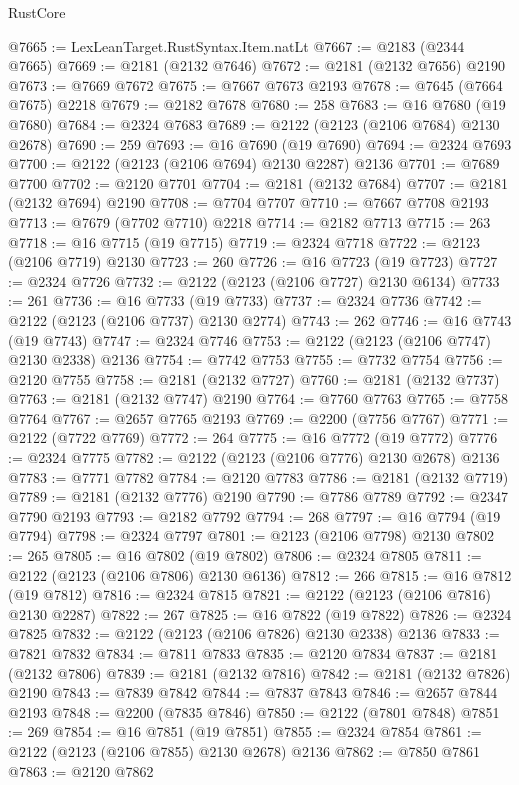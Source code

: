 \begin{lexlean}{RustCore}
\begin{coremodule}
@7665 := LexLeanTarget.RustSyntax.Item.natLt
@7667 := @2183 (@2344 @7665)
@7669 := @2181 (@2132 @7646)
@7672 := @2181 (@2132 @7656) @2190
@7673 := @7669 @7672
@7675 := @7667 @7673 @2193
@7678 := @7645 (@7664 @7675) @2218
@7679 := @2182 @7678
@7680 := 258
@7683 := @16 @7680 (@19 @7680)
@7684 := @2324 @7683
@7689 := @2122 (@2123 (@2106 @7684) @2130 @2678)
@7690 := 259
@7693 := @16 @7690 (@19 @7690)
@7694 := @2324 @7693
@7700 := @2122 (@2123 (@2106 @7694) @2130 @2287) @2136
@7701 := @7689 @7700
@7702 := @2120 @7701
@7704 := @2181 (@2132 @7684)
@7707 := @2181 (@2132 @7694) @2190
@7708 := @7704 @7707
@7710 := @7667 @7708 @2193
@7713 := @7679 (@7702 @7710) @2218
@7714 := @2182 @7713
@7715 := 263
@7718 := @16 @7715 (@19 @7715)
@7719 := @2324 @7718
@7722 := @2123 (@2106 @7719) @2130
@7723 := 260
@7726 := @16 @7723 (@19 @7723)
@7727 := @2324 @7726
@7732 := @2122 (@2123 (@2106 @7727) @2130 @6134)
@7733 := 261
@7736 := @16 @7733 (@19 @7733)
@7737 := @2324 @7736
@7742 := @2122 (@2123 (@2106 @7737) @2130 @2774)
@7743 := 262
@7746 := @16 @7743 (@19 @7743)
@7747 := @2324 @7746
@7753 := @2122 (@2123 (@2106 @7747) @2130 @2338) @2136
@7754 := @7742 @7753
@7755 := @7732 @7754
@7756 := @2120 @7755
@7758 := @2181 (@2132 @7727)
@7760 := @2181 (@2132 @7737)
@7763 := @2181 (@2132 @7747) @2190
@7764 := @7760 @7763
@7765 := @7758 @7764
@7767 := @2657 @7765 @2193
@7769 := @2200 (@7756 @7767)
@7771 := @2122 (@7722 @7769)
@7772 := 264
@7775 := @16 @7772 (@19 @7772)
@7776 := @2324 @7775
@7782 := @2122 (@2123 (@2106 @7776) @2130 @2678) @2136
@7783 := @7771 @7782
@7784 := @2120 @7783
@7786 := @2181 (@2132 @7719)
@7789 := @2181 (@2132 @7776) @2190
@7790 := @7786 @7789
@7792 := @2347 @7790 @2193
@7793 := @2182 @7792
@7794 := 268
@7797 := @16 @7794 (@19 @7794)
@7798 := @2324 @7797
@7801 := @2123 (@2106 @7798) @2130
@7802 := 265
@7805 := @16 @7802 (@19 @7802)
@7806 := @2324 @7805
@7811 := @2122 (@2123 (@2106 @7806) @2130 @6136)
@7812 := 266
@7815 := @16 @7812 (@19 @7812)
@7816 := @2324 @7815
@7821 := @2122 (@2123 (@2106 @7816) @2130 @2287)
@7822 := 267
@7825 := @16 @7822 (@19 @7822)
@7826 := @2324 @7825
@7832 := @2122 (@2123 (@2106 @7826) @2130 @2338) @2136
@7833 := @7821 @7832
@7834 := @7811 @7833
@7835 := @2120 @7834
@7837 := @2181 (@2132 @7806)
@7839 := @2181 (@2132 @7816)
@7842 := @2181 (@2132 @7826) @2190
@7843 := @7839 @7842
@7844 := @7837 @7843
@7846 := @2657 @7844 @2193
@7848 := @2200 (@7835 @7846)
@7850 := @2122 (@7801 @7848)
@7851 := 269
@7854 := @16 @7851 (@19 @7851)
@7855 := @2324 @7854
@7861 := @2122 (@2123 (@2106 @7855) @2130 @2678) @2136
@7862 := @7850 @7861
@7863 := @2120 @7862

\end{coremodule}
\end{lexlean}
